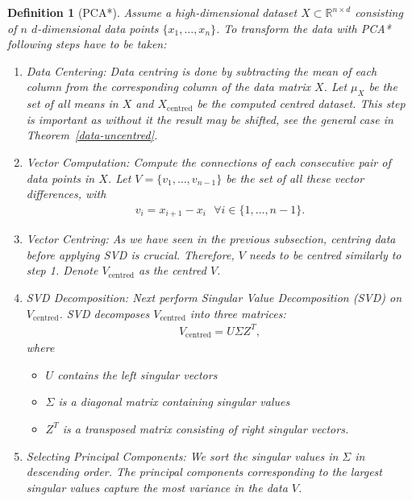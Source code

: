 \documentclass[pdftex,12pt,a4paper]{report}
\newtheorem{definition}{Definition}[section]
\begin{document}
\begin{definition}[PCA*] \label{pca*}
    Assume a high-dimensional dataset $X \subset \mathbb{R}^{n \times d}$ consisting of $n$ $d$-dimensional data points $\{x_1, \dots, x_n \} $.
    To transform the data with PCA* following steps have to be taken:
    \begin{enumerate}
        \item Data Centering: Data centring is done by subtracting the mean of each column from the corresponding column of the data matrix $X$. \label{cent-data}
        Let $\mu_X$ be the set of all means in $X$ and $X_\mathrm{centred}$ be the computed centred dataset.
        This step is important as without it the result may be shifted, see the general case in Theorem~\ref{data-uncentred}.
        \item Vector Computation: Compute the connections of each consecutive pair of data points in $X$. \label{vector-comp}
        Let $V = \{v_1, \dots, v_{n-1} \}$ be the set of all these vector differences, with
        \begin{align*}
            v_i = x_{i+1} - x_i \text{   } \forall i \in \{1, \dots, n-1\}.        
        \end{align*}
        \item Vector Centring:
        As we have seen in the previous subsection, centring data before applying SVD is crucial.
        Therefore, $V$ needs to be centred similarly to step 1.
        Denote $V_\mathrm{centred}$ as the centred $V$.
        \item SVD Decomposition: Next perform Singular Value Decomposition (SVD) on $V_\mathrm{centred}$.
        SVD decomposes $V_\mathrm{centred}$ into three matrices:
        \begin{align*}
            V_\mathrm{centred} = U \Sigma Z^T,
        \end{align*}
        where 
        \begin{itemize}
            \item $U$ contains the left singular vectors
            \item $\Sigma$ is a diagonal matrix containing singular values
            \item $Z^T$ is a transposed matrix consisting of right singular vectors.
        \end{itemize}
        \item Selecting Principal Components: We sort the singular values in $\Sigma$ in descending order.
        The principal components corresponding to the largest singular values capture the most variance in the data $V$.

\end{enumerate}
\end{definition}
\end{document}
